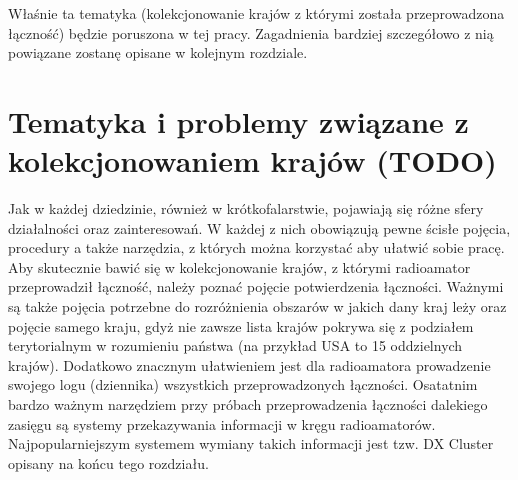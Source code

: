 \documentclass[]{mgr}
\begin{document}
                Właśnie ta tematyka (kolekcjonowanie krajów z którymi została przeprowadzona łączność) będzie poruszona w tej pracy. Zagadnienia bardziej szczegółowo z nią powiązane zostanę opisane w kolejnym rozdziale.

    \chapter{Tematyka i problemy związane z kolekcjonowaniem krajów (TODO)}
    \label{sec:collecting_entities}

    Jak w każdej dziedzinie, również w krótkofalarstwie, pojawiają się różne sfery działalności oraz zainteresowań. W każdej z nich obowiązują pewne ścisłe pojęcia, procedury a także narzędzia, z których można korzystać aby ułatwić sobie pracę. Aby skutecznie bawić się w kolekcjonowanie krajów, z którymi radioamator przeprowadził łączność, należy poznać pojęcie potwierdzenia łączności. Ważnymi są także pojęcia potrzebne do rozróżnienia obszarów w jakich dany kraj leży oraz pojęcie samego kraju, gdyż nie zawsze lista krajów pokrywa się z podziałem terytorialnym w rozumieniu państwa (na przykład USA to 15 oddzielnych krajów). Dodatkowo znacznym ułatwieniem jest dla radioamatora prowadzenie swojego logu (dziennika) wszystkich przeprowadzonych łączności. Osatatnim bardzo ważnym narzędziem przy próbach przeprowadzenia łączności dalekiego zasięgu są systemy przekazywania informacji w kręgu radioamatorów. Najpopularniejszym systemem wymiany takich informacji jest tzw. DX Cluster opisany na końcu tego rozdziału.
\end{document}
